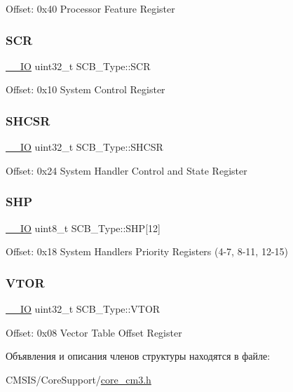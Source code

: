 Offset\+: 0x40 Processor Feature Register ~\newline
 \mbox{\label{struct_s_c_b___type_abfad14e7b4534d73d329819625d77a16}} 
\subsubsection{\texorpdfstring{SCR}{SCR}}
{\footnotesize\ttfamily \mbox{\hyperlink{group___c_m_s_i_s___c_m3__core__definitions_gaec43007d9998a0a0e01faede4133d6be}{\+\_\+\+\_\+\+IO}} uint32\+\_\+t S\+C\+B\+\_\+\+Type\+::\+S\+CR}

Offset\+: 0x10 System Control Register ~\newline
 \mbox{\label{struct_s_c_b___type_ae9891a59abbe51b0b2067ca507ca212f}} 
\subsubsection{\texorpdfstring{SHCSR}{SHCSR}}
{\footnotesize\ttfamily \mbox{\hyperlink{group___c_m_s_i_s___c_m3__core__definitions_gaec43007d9998a0a0e01faede4133d6be}{\+\_\+\+\_\+\+IO}} uint32\+\_\+t S\+C\+B\+\_\+\+Type\+::\+S\+H\+C\+SR}

Offset\+: 0x24 System Handler Control and State Register ~\newline
 \mbox{\label{struct_s_c_b___type_af6336103f8be0cab29de51daed5a65f4}} 
\subsubsection{\texorpdfstring{SHP}{SHP}}
{\footnotesize\ttfamily \mbox{\hyperlink{group___c_m_s_i_s___c_m3__core__definitions_gaec43007d9998a0a0e01faede4133d6be}{\+\_\+\+\_\+\+IO}} uint8\+\_\+t S\+C\+B\+\_\+\+Type\+::\+S\+HP\mbox{[}12\mbox{]}}

Offset\+: 0x18 System Handlers Priority Registers (4-\/7, 8-\/11, 12-\/15) \mbox{\label{struct_s_c_b___type_a0faf96f964931cadfb71cfa54e051f6f}} 
\subsubsection{\texorpdfstring{VTOR}{VTOR}}
{\footnotesize\ttfamily \mbox{\hyperlink{group___c_m_s_i_s___c_m3__core__definitions_gaec43007d9998a0a0e01faede4133d6be}{\+\_\+\+\_\+\+IO}} uint32\+\_\+t S\+C\+B\+\_\+\+Type\+::\+V\+T\+OR}

Offset\+: 0x08 Vector Table Offset Register ~\newline
 

Объявления и описания членов структуры находятся в файле\+:\begin{DoxyCompactItemize}
\item 
C\+M\+S\+I\+S/\+Core\+Support/\mbox{\hyperlink{core__cm3_8h}{core\+\_\+cm3.\+h}}\end{DoxyCompactItemize}

